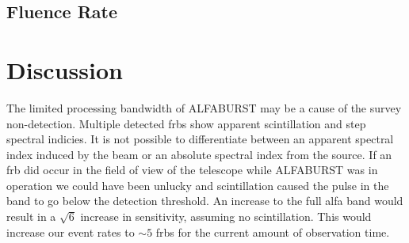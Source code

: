 \documentclass[a4paper,fleqn,usenatbib]{mnras}
\begin{document}


\subsection{Fluence Rate}
\label{sec:fluence}



\section{Discussion}
\label{sec:discuss}


The limited processing bandwidth of ALFABURST may be a cause of the survey
non-detection. Multiple detected \glspl{frb} show apparent scintillation and
step spectral indicies. It is not possible to differentiate between an
apparent spectral index induced by the beam or an absolute spectral index from
the source. If an \gls{frb} did occur in the field of view of the telescope
while ALFABURST was in operation we could have been unlucky and scintillation
caused the pulse in the band to go below the detection threshold. An increase to
the full \gls{alfa} band would result in a $\sqrt{6}$ increase in sensitivity,
assuming no scintillation. This would increase our event rates to $\sim 5$
\glspl{frb} for the current amount of observation time.
\end{document}
